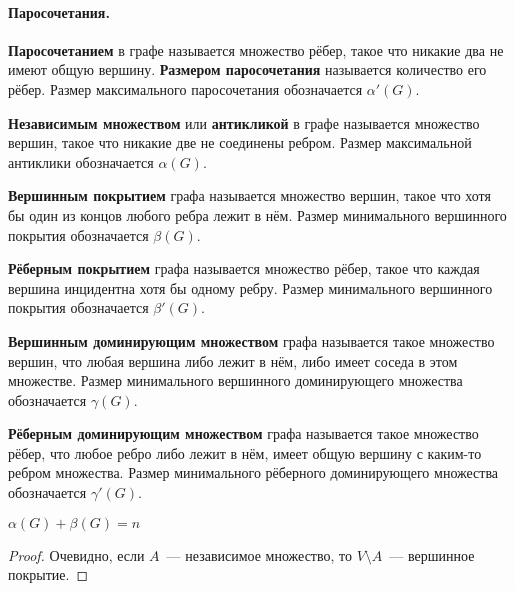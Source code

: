 \documentclass{article}
\begin{document}
    \paragraph{Паросочетания.}
    \begin{definition}
        \textbf{Паросочетанием} в графе называется множество рёбер, такое что никакие два не имеют общую вершину. \textbf{Размером паросочетания} называется количество его рёбер. Размер максимального паросочетания обозначается $\alpha'(G)$.
    \end{definition}
    \begin{definition}
        \textbf{Независимым множеством} или \textbf{антикликой} в графе называется множество вершин, такое что никакие две не соединены ребром. Размер максимальной антиклики обозначается $\alpha(G)$.
    \end{definition}
    \begin{definition}
        \textbf{Вершинным покрытием} графа называется множество вершин, такое что хотя бы один из концов любого ребра лежит в нём. Размер минимального вершинного покрытия обозначается $\beta(G)$.
    \end{definition}
    \begin{definition}
        \textbf{Рёберным покрытием} графа называется множество рёбер, такое что каждая вершина инцидентна хотя бы одному ребру. Размер минимального вершинного покрытия обозначается $\beta'(G)$.
    \end{definition}
    \begin{definition}
        \textbf{Вершинным доминирующим множеством} графа называется такое множество вершин, что любая вершина либо лежит в нём, либо имеет соседа в этом множестве. Размер минимального вершинного доминирующего множества обозначается $\gamma(G)$.
    \end{definition}
    \begin{definition}
        \textbf{Рёберным доминирующим множеством} графа называется такое множество рёбер, что любое ребро либо лежит в нём, имеет общую вершину с каким-то ребром множества. Размер минимального рёберного доминирующего множества обозначается $\gamma'(G)$.
    \end{definition}
    \begin{claim}
        $\alpha(G)+\beta(G)=n$
    \end{claim}
    \begin{proof}
        Очевидно, если $A$~--- независимое множество, то $V\setminus A$~--- вершинное покрытие.
    \end{proof}
\end{document}
